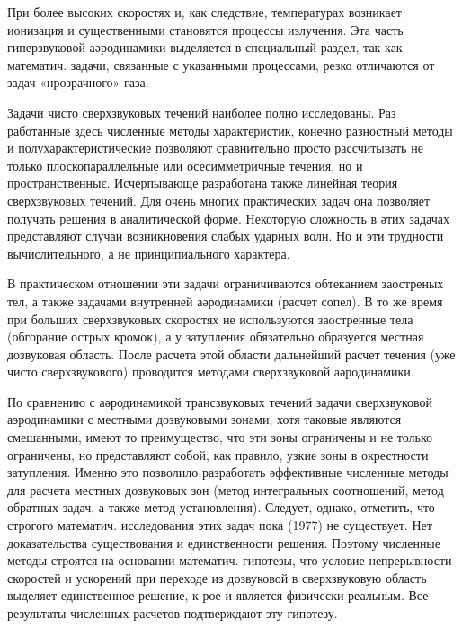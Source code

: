 \documentclass[10pt]{article}
\begin{document}
При более высоких скоростях и, как следствие, температурах возникает ионизация и существенными становятся процессы излучения. Эта часть гиперзвуковой аәродинамики выделяется в специальный раздел, так как математич. задачи, связанные с указанными процессами, резко отличаются от задач «нрозрачного» газа.



Задачи чисто сверхзвуковых течений наиболее полно исследованы. Раз работанные здесь численные методы характеристик, конечно разностный методы и полухарактеристические позволяют сравнительно просто рассчитывать не только плоскопараллельные или осесимметричные течения, но и пространственныє. Исчерпывающе разработана также линейная теория сверхзвуковых течений. Для очень многих практических задач она позволяет получать решения в аналитической форме. Некоторую сложность в әтих задачах представляют случаи возникновения слабых ударных волн. Но и эти трудности вычислительного, а не принципиального характера.



В практическом отношении эти задачи ограничиваются обтеканием заостреных тел, а также задачами внутренней аәродинамики (расчет сопел). В то же время при больших сверхзвуковых скоростях не используются заостренные тела (обгорание острых кромок), а у затупления обязательно образуется местная дозвуковая область. После расчета этой области дальнейший расчет течения (уже чисто сверхзвукового) проводится методами сверхзвуковой аәродинамики.



По сравнению с аәродинамикой трансзвуковых течений задачи сверхзвуковой аэродинамики с местными дозвуковыми зонами, хотя таковые являются смешанными, имеют то преимущество, что эти зоны ограничены и не только ограничены, но представляют собой, как правило, узкие зоны в окрестности затупления. Именно это позволило разработать әффективные численные методы для расчета местных дозвуковых зон (метод интегральных соотношений, метод обратных задач, а также метод установления). Следует, однако, отметить, что строгого математич. исследования этих задач пока (1977) не существует. Нет доказательства существования и единственности решения. Поэтому численные методы строятся на основании математич. гипотезы, что условие непрерывности скоростей и ускорений при переходе из дозвуковой в сверхзвуковую область выделяет единственное решение, к-рое и является физически реальным. Все результаты численных расчетов подтверждают эту гипотезу.
\end{document}
